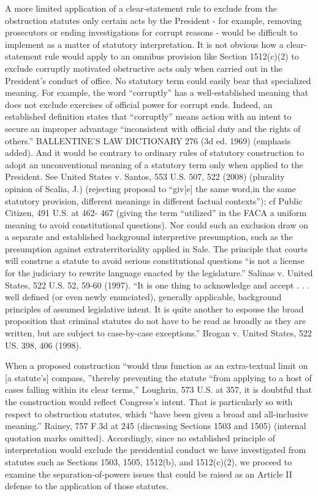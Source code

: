 A more limited application of a clear-statement rule to exclude from the obstruction statutes only certain acts by the President - for example, removing prosecutors or ending investigations for corrupt reasons - would be difficult to implement as a matter of statutory interpretation.
It is not obvious how a clear-statement rule would apply to an omnibus provision like Section 1512(c)(2) to exclude corruptly motivated obstructive acts only when carried out in the President’s conduct of office.
No statutory term could easily bear that specialized meaning.
For example, the word “corruptly” has a well-established meaning that does not exclude exercises of official power for corrupt ends.
Indeed, an established definition states that “corruptly” means action with an intent to secure an improper advantage “inconsistent with official duty and the rights of others.” BALLENTINE’S LAW DICTIONARY 276 (3d ed. 1969) (emphasis added).
And it would be contrary to ordinary rules of statutory construction to adopt an unconventional meaning of a statutory term only when applied to the President.
See United States v. Santos, 553 U.S. 507, 522 (2008) (plurality opinion of Scalia, J.) (rejecting proposal to “giv[e] the same word,in the same statutory provision, different meanings in different factual contexts”); cf Public Citizen, 491 U.S. at 462- 467 (giving the term “utilized” in the FACA a uniform meaning to avoid constitutional questions).
Nor could such an exclusion draw on a separate and established background interpretive presumption, such as the presumption against extraterritoriality applied in Sale.
The principle that courts will construe a statute to avoid serious constitutional questions “is not a license for the judiciary to rewrite language enacted by the legislature.” Salinas v. United States, 522 U.S. 52, 59-60 (1997).
“It is one thing to acknowledge and accept . . . well defined (or even newly enunciated), generally applicable, background principles of assumed legislative intent.
It is quite another to espouse the broad proposition that criminal statutes do not have to be read as broadly as they are written, but are subject to case-by-case exceptions.” Brogan v. United States, 522 US. 398, 406 (1998).

When a proposed construction “would thus function as an extra-textual limit on [a statute’s] compass, ”thereby preventing the statute “from applying to a host of cases falling within its clear terms,” Loughrin, 573 U.S. at 357, it is doubtful that the construction would reflect Congress’s intent.
That is particularly so with respect to obstruction statutes, which “have been given a broad and all-inclusive meaning.” Rainey, 757 F.3d at 245 (discussing Sections 1503 and 1505) (internal quotation marks omitted).
Accordingly, since no established principle of interpretation would exclude the presidential conduct we have investigated from statutes such as Sections 1503, 1505, 1512(b), and 1512(c)(2), we proceed to examine the separation-of-powers issues that could be raised as an Article II defense to the application of those statutes.

